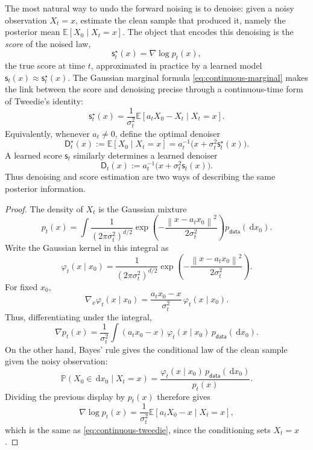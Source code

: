 \documentclass[10pt,a4paper]{amsart}
\numberwithin{equation}{section}
\newcommand{\E}{\mathbb{E}}
\newcommand{\Pp}{\mathbb{P}}
\newcommand{\dd}{\,\mathrm{d}}
\newcommand{\norm}[1]{\left\lVert #1 \right\rVert}
\newcommand{\pdata}{p_{\mathsf{data}}}
\newcommand{\sstar}{\mathsf{s}^{\star}}
\newcommand{\score}{\mathsf{s}}
\newcommand{\dstar}{\mathsf{D}^{\star}}
\newcommand{\denoiser}{\mathsf{D}}
\begin{document}
The most natural way to undo the forward noising is to denoise: given a noisy
observation $X_t=x$, estimate the clean sample that produced it, namely the
posterior mean $\E[X_0\mid X_t=x]$.  The object that encodes this denoising is
the \emph{score} of the noised law,
\begin{equation}\label{eq:continuous-score}
    \sstar_t(x)=\nabla\log p_t(x),
\end{equation}
the true score at time $t$, approximated in practice by a learned model
$\score_t(x)\approx\sstar_t(x)$.  The Gaussian marginal formula
\eqref{eq:continuous-marginal} makes the link between the score and denoising
precise through a continuous-time form of Tweedie's identity:
\begin{equation}\label{eq:continuous-tweedie}
    \sstar_t(x)
    =
    \frac{1}{\sigma_t^2}
    \E[a_tX_0-X_t\mid X_t=x].
\end{equation}
Equivalently, whenever $a_t\neq0$, define the optimal denoiser
\[
    \dstar_t(x)
    :=
    \E[X_0\mid X_t=x]
    =
    a_t^{-1}\bigl(x+\sigma_t^2\sstar_t(x)\bigr).
\]
A learned score $\score_t$ similarly determines a learned denoiser
\[
    \denoiser_t(x)
    :=
    a_t^{-1}\bigl(x+\sigma_t^2\score_t(x)\bigr).
\]
Thus denoising and score estimation are two ways of describing the same
posterior information.

\begin{proof}
The density of $X_t$ is the Gaussian mixture
\[
    p_t(x)=
    \int \frac{1}{(2\pi\sigma_t^2)^{d/2}}
    \exp\left(-\frac{\norm{x-a_tx_0}^2}{2\sigma_t^2}\right)
    \pdata(\dd x_0).
\]
Write the Gaussian kernel in this integral as
\[
    \varphi_t(x\mid x_0)
    =
    \frac{1}{(2\pi\sigma_t^2)^{d/2}}
    \exp\left(-\frac{\norm{x-a_tx_0}^2}{2\sigma_t^2}\right).
\]
For fixed $x_0$,
\[
    \nabla_x\varphi_t(x\mid x_0)
    =
    \frac{a_tx_0-x}{\sigma_t^2}\,\varphi_t(x\mid x_0).
\]
Thus, differentiating under the integral,
\[
    \nabla p_t(x)
    =
    \frac{1}{\sigma_t^2}
    \int (a_tx_0-x)\,\varphi_t(x\mid x_0)\,\pdata(\dd x_0).
\]
On the other hand, Bayes' rule gives the conditional law of the clean sample
given the noisy observation:
\[
    \Pp(X_0\in\dd x_0\mid X_t=x)
    =
    \frac{\varphi_t(x\mid x_0)\,\pdata(\dd x_0)}{p_t(x)}.
\]
Dividing the previous display by $p_t(x)$ therefore gives
\[
    \nabla\log p_t(x)
    =
    \frac{1}{\sigma_t^2}
    \E[a_tX_0-x\mid X_t=x],
\]
which is the same as \eqref{eq:continuous-tweedie}, since the conditioning
sets $X_t=x$.
\end{proof}
\end{document}
